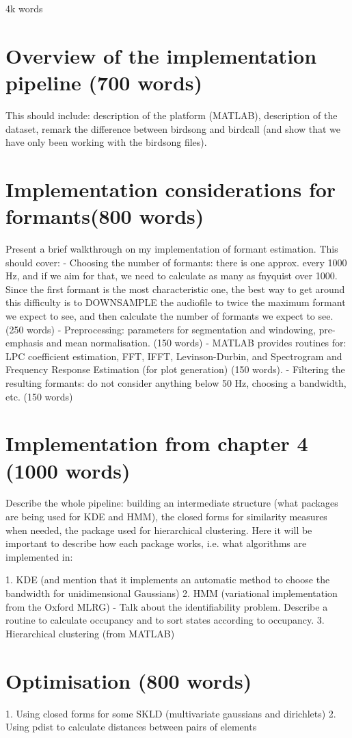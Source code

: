 \documentclass[../main.tex]{subfiles}
\begin{document}
 \label{chapter_account}
4k words 

\section{Overview of the implementation pipeline (700 words)}
This should include: description of the platform (MATLAB), description of the dataset, remark the difference between birdsong and birdcall (and show that we have only been working with the birdsong files).
\section{Implementation considerations for formants(800 words)}
    Present a brief walkthrough on my implementation of formant estimation. This should cover:
    - Choosing the number of formants: there is one approx. every 1000 Hz, and if we aim for that, we need to calculate as many as fnyquist over 1000. Since the first formant is the most characteristic one, the best way to get around this difficulty is to DOWNSAMPLE the audiofile to twice the maximum formant we expect to see, and then calculate the number of formants we expect to see. (250 words)
    - Preprocessing: parameters for segmentation and windowing, pre-emphasis and mean normalisation. (150 words)
    - MATLAB provides routines for: LPC coefficient estimation, FFT, IFFT, Levinson-Durbin, and Spectrogram and Frequency Response Estimation (for plot generation) (150 words).
    - Filtering the resulting formants: do not consider anything below 50 Hz, choosing a bandwidth, etc.  (150 words)
    
\section{Implementation from chapter 4 (1000 words)}
Describe the whole pipeline: building an intermediate structure (what packages are being used for KDE and HMM), the closed forms for similarity measures when needed, the package used for hierarchical clustering. Here it will be important to describe how each package works, i.e. what algorithms are implemented in:

1. KDE (and mention that it implements an automatic method to choose the bandwidth for unidimensional Gaussians)
2. HMM (variational implementation from the Oxford MLRG)
    - Talk about the identifiability problem. Describe a routine to calculate occupancy and to sort states according to occupancy.
3. Hierarchical clustering (from MATLAB)

\section{Optimisation (800 words)}
1. Using closed forms for some SKLD (multivariate gaussians and dirichlets)
2. Using pdist to calculate distances between pairs of elements
\end{document}
